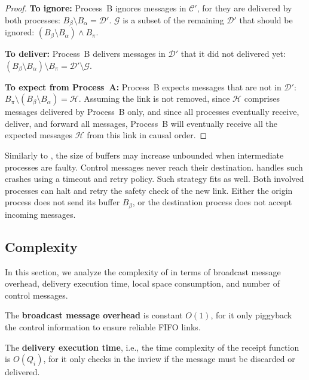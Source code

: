 \begin{proof}
  \noindent\textbf{To ignore:} Process~B ignores messages in $\mathcal{C}'$,
  for they are
  delivered by both processes: $B_\beta \setminus B_\alpha = \mathcal{D}'$.
  $\mathcal{G}$ is a subset of the remaining $\mathcal{D}'$ that should be
  ignored: $(B_\beta \setminus B_\alpha) \wedge B_\pi$.

  \noindent \textbf{To deliver:} Process~B delivers messages in $\mathcal{D}'$
  that it did not delivered yet:
  $(B_\beta\setminus B_\alpha) \setminus B_\pi = \mathcal{D}' \setminus
  \mathcal{G}$.
  
  \noindent \textbf{To expect from Process~A:} Process~B expects messages that
  are not in $\mathcal{D}'$:
  $B_\pi \setminus (B_\beta \setminus B_\alpha) = \mathcal{H}$.  Assuming the
  link is not removed, since $\mathcal{H}$ comprises messages delivered by
  Process~B only, and since all processes eventually receive, deliver, and
  forward all messages, Process~B will eventually receive all the expected
  messages $\mathcal{H}$ from this link in causal order.
\end{proof}


Similarly to \PCBROADCAST, the size of buffers may increase unbounded when
intermediate processes are faulty. Control messages never reach their
destination. \PCBROADCAST handles such crashes using a timeout and retry
policy. Such strategy fits \RPCBROADCAST as well. Both involved processes can
halt and retry the safety check of the new link. Either the origin process does
not send its buffer $B_\beta$, or the destination process does not accept
incoming messages.

\subsection{Complexity}
\label{subsec:complexity}

In this section, we analyze the complexity of \RPCBROADCAST in terms of
broadcast message overhead, delivery execution time, local space consumption,
and number of control messages. 

\noindent The \textbf{broadcast message overhead} is constant $O(1)$, for it
only piggyback the control information to ensure reliable FIFO links.

\noindent The \textbf{delivery execution time}, i.e., the time complexity of the
receipt function is $O(Q_i)$, for it only checks in the inview if the message
must be discarded or delivered.

